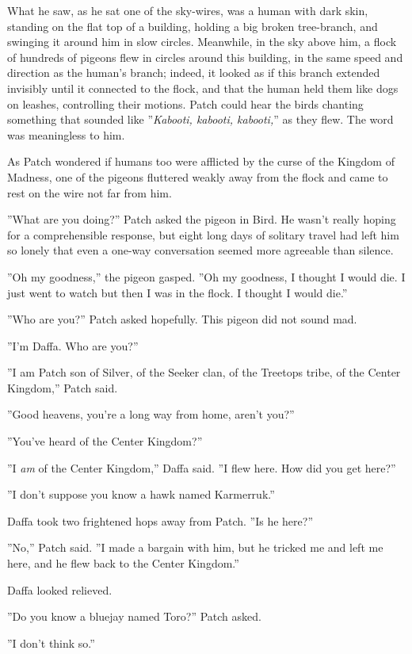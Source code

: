 \documentclass[12pt]{book}
\begin{document}
What he saw, as he sat one of the sky-wires, was a human with dark skin, standing on the flat top of a building, holding a big broken tree-branch, and swinging it around him in slow circles. Meanwhile, in the sky above him, a flock of hundreds of pigeons flew in circles around this building, in the same speed and direction as the human's branch; indeed, it looked as if this branch extended invisibly until it connected to the flock, and that the human held them like dogs on leashes, controlling their motions. Patch could hear the birds chanting something that sounded like ''{\it Kabooti, kabooti, kabooti,}'' as they flew. The word was meaningless to him.

As Patch wondered if humans too were afflicted by the curse of the Kingdom of Madness, one of the pigeons fluttered weakly away from the flock and came to rest on the wire not far from him.

''What are you doing?'' Patch asked the pigeon in Bird. He wasn't really hoping for a comprehensible response, but eight long days of solitary travel had left him so lonely that even a one-way conversation seemed more agreeable than silence.

''Oh my goodness,'' the pigeon gasped. ''Oh my goodness, I thought I would die. I just went to watch but then I was in the flock. I thought I would die.''

''Who are you?'' Patch asked hopefully. This pigeon did not sound mad.

''I'm Daffa. Who are you?''

''I am Patch son of Silver, of the Seeker clan, of the Treetops tribe, of the Center Kingdom,'' Patch said.

''Good heavens, you're a long way from home, aren't you?''

''You've heard of the Center Kingdom?''

''I {\it am} of the Center Kingdom,'' Daffa said. ''I flew here. How did you get here?''

''I don't suppose you know a hawk named Karmerruk.''

Daffa took two frightened hops away from Patch. ''Is he here?''

''No,'' Patch said. ''I made a bargain with him, but he tricked me and left me here, and he flew back to the Center Kingdom.''

Daffa looked relieved.

''Do you know a bluejay named Toro?'' Patch asked.

''I don't think so.''
\end{document}
